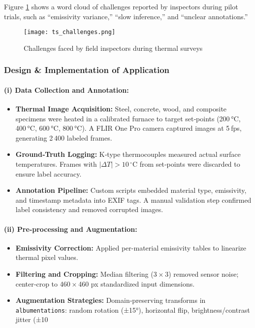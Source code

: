 \noindent Figure \ref{fig:ts_challenges} shows a word cloud of challenges reported by inspectors during pilot trials, such as “emissivity variance,” “slow inference,” and “unclear annotations.”

\begin{figure}[H]
    \centering
    \texttt{[image: ts\_challenges.png]}
    \caption{Challenges faced by field inspectors during thermal surveys}
    \label{fig:ts_challenges}
\end{figure}

\subsubsection*{Design \& Implementation of Application}

\paragraph{(i) Data Collection and Annotation:}
\begin{itemize}
    \item \textbf{Thermal Image Acquisition:}  
    Steel, concrete, wood, and composite specimens were heated in a calibrated furnace to target set‐points (200 °C, 400 °C, 600 °C, 800 °C). A FLIR One Pro camera captured images at 5 fps, generating 2 400 labeled frames.
    \item \textbf{Ground‐Truth Logging:}  
    K‐type thermocouples measured actual surface temperatures. Frames with $|\Delta T| > 10\,\mathrm{^{\circ}C}$ from set‐points were discarded to ensure label accuracy.
    \item \textbf{Annotation Pipeline:}  
    Custom scripts embedded material type, emissivity, and timestamp metadata into EXIF tags. A manual validation step confirmed label consistency and removed corrupted images.
\end{itemize}

\paragraph{(ii) Pre‐processing and Augmentation:}
\begin{itemize}
    \item \textbf{Emissivity Correction:}  
    Applied per-material emissivity tables to linearize thermal pixel values.  
    \item \textbf{Filtering and Cropping:}  
    Median filtering (3 × 3) removed sensor noise; center‐crop to 460 × 460 px standardized input dimensions.  
    \item \textbf{Augmentation Strategies:}  
    Domain‐preserving transforms in \texttt{albumentations}: random rotation (±15°), horizontal flip, brightness/contrast jitter (±10 %
\end{itemize}

